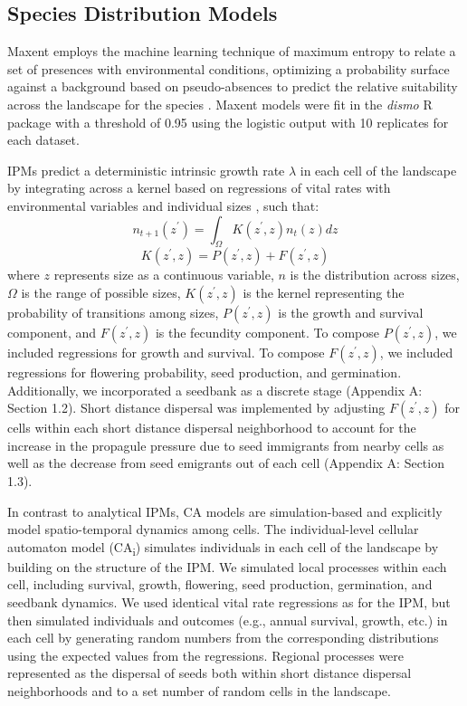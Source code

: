 \documentclass[preprint,review,times,12pt]{elsarticle}
\begin{document}
\subsection{Species Distribution Models}
Maxent employs the machine learning technique of maximum entropy to relate a set of presences with environmental conditions, optimizing a probability surface against a background based on pseudo-absences to predict the relative suitability across the landscape for the species \citep{Phillips2008}. Maxent models were fit in the \emph{dismo} R package with a threshold of 0.95 using the logistic output with 10 replicates for each dataset. 

IPMs predict a deterministic intrinsic growth rate $\lambda$ in each cell of the landscape by integrating across a kernel based on regressions of vital rates with environmental variables and individual sizes \citep{Easterling2000,Ellner2006,Merow2014a,Merow2017}, such that: 
\begin{equation}
    n_{t+1}(z^{\prime}) = \int_{\Omega} K(z^{\prime}, z) n_t(z) dz 
\end{equation}
\begin{equation}
    K(z^{\prime}, z) = P(z^{\prime}, z) + F(z^{\prime}, z)
\end{equation}
where $z$ represents size as a continuous variable, $n$ is the distribution across sizes, $\Omega$ is the range of possible sizes, $K(z^{\prime}, z)$ is the kernel representing the probability of transitions among sizes, $P(z^{\prime}, z)$ is the growth and survival component, and $F(z^{\prime}, z)$ is the fecundity component. To compose $P(z^{\prime}, z)$, we included regressions for growth and survival. To compose $F(z^{\prime}, z)$, we included regressions for flowering probability, seed production, and germination. Additionally, we incorporated a seedbank as a discrete stage (Appendix A: Section 1.2). Short distance dispersal was implemented by adjusting $F(z^{\prime}, z)$ for cells within each short distance dispersal neighborhood to account for the increase in the propagule pressure due to seed immigrants from nearby cells as well as the decrease from seed emigrants out of each cell (Appendix A: Section 1.3). 

In contrast to analytical IPMs, CA models are simulation-based and explicitly model spatio-temporal dynamics among cells. The individual-level cellular automaton model (CA\textsubscript{i}) simulates individuals in each cell of the landscape by building on the structure of the IPM. We simulated local processes within each cell, including survival, growth, flowering, seed production, germination, and seedbank dynamics. We used identical vital rate regressions as for the IPM, but then simulated individuals and outcomes (e.g., annual survival, growth, etc.) in each cell by generating random numbers from the corresponding distributions using the expected values from the regressions. Regional processes were represented as the dispersal of seeds both within short distance dispersal neighborhoods and to a set number of random cells in the landscape. 
\end{document}
